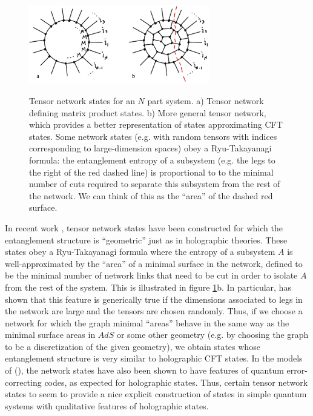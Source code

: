 \documentclass[12pt,epsf]{article}
\begin{document}
\begin{figure}
\centering
\includegraphics[width=0.7\textwidth]{figTN.eps}\\
\caption{Tensor network states for an $N$ part system. a) Tensor network defining matrix product states. b) More general tensor network, which provides a better representation of states approximating CFT states. Some network states (e.g. with random tensors with indices corresponding to large-dimension spaces) obey a Ryu-Takayanagi formula: the entanglement entropy of a subsystem (e.g. the legs to the right of the red dashed line) is proportional to to the minimal number of cuts required to separate this subsystem from the rest of the network. We can think of this as the ``area'' of the dashed red surface. }
\label{figTN}
\end{figure}

In recent work \cite{Pastawski:2015qua,Hayden:2016cfa}, tensor network states have been constructed for which the entanglement structure is ``geometric'' just as in holographic theories. These states obey a Ryu-Takayanagi formula where the entropy of a subsystem $A$ is well-approximated by the ``area'' of a minimal surface in the network, defined to be the minimal number of network links that need to be cut in order to isolate $A$ from the rest of the system. This is illustrated in figure \ref{figTN}b. In particular, \cite{Hayden:2016cfa} has shown that this feature is generically true if the dimensions associated to legs in the network are large and the tensors are chosen randomly. Thus, if we choose a network for which the graph minimal ``areas'' behave in the same way as the minimal surface areas in $AdS$ or some other geometry (e.g. by choosing the graph to be a discretization of the given geometry), we obtain states whose entanglement structure is very similar to holographic CFT states. In the models of (\cite{Pastawski:2015qua}), the network states have also been shown to have features of quantum error-correcting codes, as expected for holographic states. Thus, certain tensor network states to seem to provide a nice explicit construction of states in simple quantum systems with qualitative features of holographic states.
\end{document}
